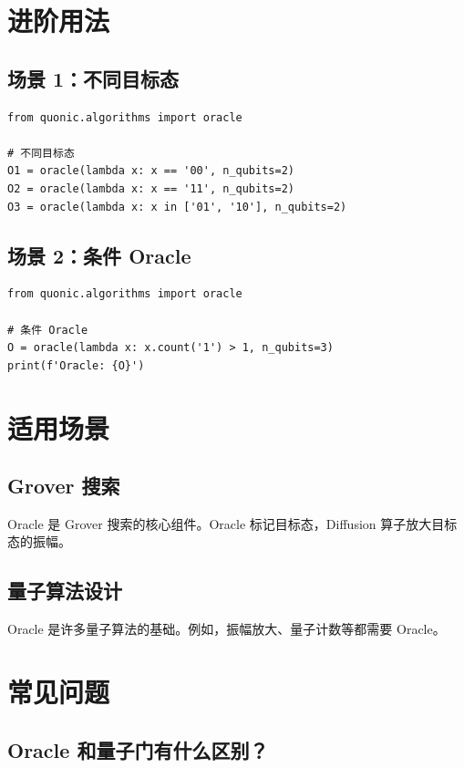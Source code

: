 \documentclass[12pt,a4paper]{article}
\begin{document}
\section{进阶用法}

\subsection{场景 1：不同目标态}

\begin{verbatim}
from quonic.algorithms import oracle

# 不同目标态
O1 = oracle(lambda x: x == '00', n_qubits=2)
O2 = oracle(lambda x: x == '11', n_qubits=2)
O3 = oracle(lambda x: x in ['01', '10'], n_qubits=2)
\end{verbatim}

\subsection{场景 2：条件 Oracle}

\begin{verbatim}
from quonic.algorithms import oracle

# 条件 Oracle
O = oracle(lambda x: x.count('1') > 1, n_qubits=3)
print(f'Oracle: {O}')
\end{verbatim}

\section{适用场景}

\subsection{Grover 搜索}

Oracle 是 Grover 搜索的核心组件。Oracle 标记目标态，Diffusion 算子放大目标态的振幅。

\subsection{量子算法设计}

Oracle 是许多量子算法的基础。例如，振幅放大、量子计数等都需要 Oracle。

\section{常见问题}

\subsection{Oracle 和量子门有什么区别？}
\end{document}
